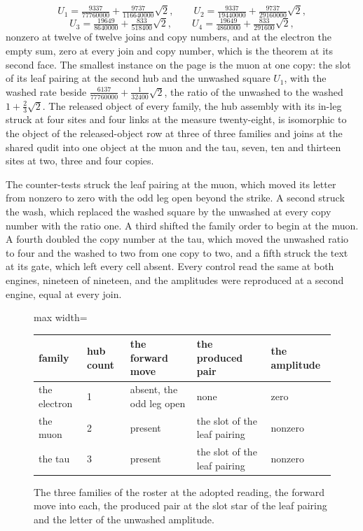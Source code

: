 \begin{chproof}
\begin{equation}
U_{1} = \tfrac{9337}{77760000} + \tfrac{9737}{116640000}\sqrt{2} , \qquad U_{2} = \tfrac{9337}{19440000} + \tfrac{9737}{29160000}\sqrt{2} ,
\end{equation}
\begin{equation}
U_{3} = \tfrac{19649}{8640000} + \tfrac{833}{518400}\sqrt{2} , \qquad U_{4} = \tfrac{19649}{4860000} + \tfrac{833}{291600}\sqrt{2} ,
\end{equation}
nonzero at twelve of twelve joins and copy numbers, and at the electron the empty sum, zero at every join and copy number, which is the theorem at its second face. The smallest instance on the page is the muon at one copy: the slot of its leaf pairing at the second hub and the unwashed square $U_{1}$, with the washed rate beside $\tfrac{6137}{77760000} + \tfrac{1}{32400}\sqrt{2}$, the ratio of the unwashed to the washed $1 + \tfrac{2}{3}\sqrt{2}$. The released object of every family, the hub assembly with its in-leg struck at four sites and four links at the measure twenty-eight, is isomorphic to the object of the released-object row at three of three families and joins at the shared qudit into one object at the muon and the tau, seven, ten and thirteen sites at two, three and four copies.

The counter-tests struck the leaf pairing at the muon, which moved its letter from nonzero to zero with the odd leg open beyond the strike. A second struck the wash, which replaced the washed square by the unwashed at every copy number with the ratio one. A third shifted the family order to begin at the muon. A fourth doubled the copy number at the tau, which moved the unwashed ratio to four and the washed to two from one copy to two, and a fifth struck the text at its gate, which left every cell absent. Every control read the same at both engines, nineteen of nineteen, and the amplitudes were reproduced at a second engine, equal at every join.
\end{chproof}
\begin{figure}[h]\centering
\begin{adjustbox}{max width=\linewidth}\begin{tabular}{lllll}\toprule
family & hub count & the forward move & the produced pair & the amplitude \\ \midrule
the electron & 1 & absent, the odd leg open & none & zero \\
the muon & 2 & present & the slot of the leaf pairing & nonzero \\
the tau & 3 & present & the slot of the leaf pairing & nonzero \\ \bottomrule
\end{tabular}\end{adjustbox}
\caption{The three families of the roster at the adopted reading, the forward move into each, the produced pair at the slot star of the leaf pairing and the letter of the unwashed amplitude.}
\end{figure}
